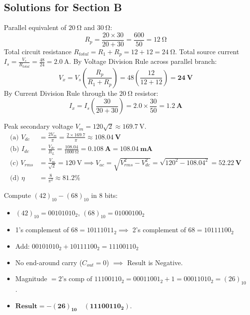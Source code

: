 \subsection*{Solutions for Section B}
\begin{solutionbox}
Parallel equivalent of $\SI{20}{\ohm}$ and $\SI{30}{\ohm}$:
$$R_p = \frac{20 \times 30}{20 + 30} = \frac{600}{50} = \SI{12}{\ohm}$$
Total circuit resistance $R_{total} = R_1 + R_p = 12 + 12 = \SI{24}{\ohm}$.
Total source current $I_s = \frac{V_s}{R_{total}} = \frac{48}{24} = \SI{2.0}{\ampere}$.
By Voltage Division Rule across parallel branch:
$$V_x = V_s \left(\frac{R_p}{R_1 + R_p}\right) = 48 \left(\frac{12}{12 + 12}\right) = \mathbf{\SI{24}{\volt}}$$
By Current Division Rule through the $\SI{20}{\ohm}$ resistor:
$$I_x = I_s \left(\frac{30}{20 + 30}\right) = 2.0 \times \frac{30}{50} = \mathbf{\SI{1.2}{\ampere}}$$
\end{solutionbox}

\begin{solutionbox}
Peak secondary voltage $V_m = 120\sqrt{2} \approx \SI{169.7}{\volt}$.
\begin{align*}
    \text{(a) } V_{dc} &= \frac{2V_m}{\pi} = \frac{2 \times 169.7}{\pi} \approx \mathbf{\SI{108.04}{\volt}} \\
    \text{(b) } I_{dc} &= \frac{V_{dc}}{R_L} = \frac{108.04}{\SI{1000}{\ohm}} = \mathbf{\SI{0.108}{\ampere} = \SI{108.04}{\milli\ampere}} \\
    \text{(c) } V_{rms} &= \frac{V_m}{\sqrt{2}} = \SI{120}{\volt} \implies V_{ac} = \sqrt{V_{rms}^2 - V_{dc}^2} = \sqrt{120^2 - 108.04^2} = \mathbf{\SI{52.22}{\volt}} \\
    \text{(d) } \eta &= \frac{8}{\pi^2} \approx \mathbf{81.2\%}
\end{align*}
\end{solutionbox}

\begin{solutionbox}
Compute $(42)_{10} - (68)_{10}$ in 8 bits:
\begin{itemize}
    \item $(42)_{10} = 00101010_2$, $(68)_{10} = 01000100_2$
    \item 1's complement of $68 = 10111011_2 \implies$ 2's complement of $68 = 10111100_2$
    \item Add: $00101010_2 + 10111100_2 = 11100110_2$
    \item No end-around carry ($C_{out} = 0$) $\implies$ Result is Negative.
    \item Magnitude $= 2\text{'s comp of } 11100110_2 = 00011001_2 + 1 = 00011010_2 = (26)_{10}$.
    \item $\mathbf{\text{Result} = -(26)_{10} \quad (11100110_2)}$.
\end{itemize}
\end{solutionbox}

